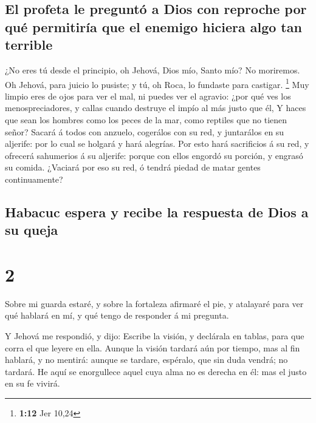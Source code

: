 \hypertarget{el-profeta-le-preguntuxf3-a-dios-con-reproche-por-quuxe9-permitiruxeda-que-el-enemigo-hiciera-algo-tan-terrible}{%
\subsection{El profeta le preguntó a Dios con reproche por qué
permitiría que el enemigo hiciera algo tan
terrible}\label{el-profeta-le-preguntuxf3-a-dios-con-reproche-por-quuxe9-permitiruxeda-que-el-enemigo-hiciera-algo-tan-terrible}}

 ¿No eres tú desde el principio, oh Jehová, Dios mío,
Santo mío? No moriremos. Oh Jehová, para juicio lo pusiste; y tú, oh
Roca, lo fundaste para castigar. \footnote{\textbf{1:12} Jer 10,24}
 Muy limpio eres de ojos para ver el mal, ni puedes ver
el agravio: ¿por qué ves los menospreciadores, y callas cuando destruye
el impío al más justo que él,  Y haces que sean los
hombres como los peces de la mar, como reptiles que no tienen señor?
 Sacará á todos con anzuelo, cogerálos con su red, y
juntarálos en su aljerife: por lo cual se holgará y hará alegrías.
 Por esto hará sacrificios á su red, y ofrecerá
sahumerios á su aljerife: porque con ellos engordó su porción, y engrasó
su comida.  ¿Vaciará por eso su red, ó tendrá piedad de
matar gentes continuamente?

\hypertarget{habacuc-espera-y-recibe-la-respuesta-de-dios-a-su-queja}{%
\subsection{Habacuc espera y recibe la respuesta de Dios a su
queja}\label{habacuc-espera-y-recibe-la-respuesta-de-dios-a-su-queja}}

\hypertarget{section-1}{%
\section{2}\label{section-1}}

 Sobre mi guarda estaré, y sobre la fortaleza afirmaré el
pie, y atalayaré para ver qué hablará en mí, y qué tengo de responder á
mi pregunta.

 Y Jehová me respondió, y dijo: Escribe la visión, y
declárala en tablas, para que corra el que leyere en ella.
 Aunque la visión tardará aún por tiempo, mas al fin
hablará, y no mentirá: aunque se tardare, espéralo, que sin duda vendrá;
no tardará.  He aquí se enorgullece aquel cuya alma no es
derecha en él: mas el justo en su fe vivirá.


